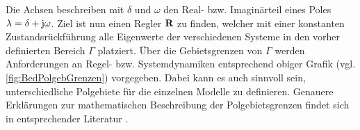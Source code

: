Die Achsen beschreiben mit $\delta$ und $\omega$ den Real- bzw. Imaginärteil eines Poles $\lambda = \delta +\textnormal{j}\omega$.
Ziel ist nun einen Regler $\textbf{R}$ zu finden, welcher mit einer konstanten Zustandsrückführung alle Eigenwerte der verschiedenen Systeme in den vorher definierten Bereich $\Gamma$ platziert.
Über die Gebietsgrenzen von $\Gamma$ werden Anforderungen an Regel- bzw. Systemdynamiken entsprechend obiger Grafik (vgl. \ref{fig:BedPolgebGrenzen}) vorgegeben.
Dabei kann es auch sinnvoll sein, unterschiedliche Polgebiete für die einzelnen Modelle zu definieren. Genauere Erklärungen zur mathematischen Beschreibung der Polgebietsgrenzen findet sich in entsprechender Literatur \cite{RobReg}.\\

